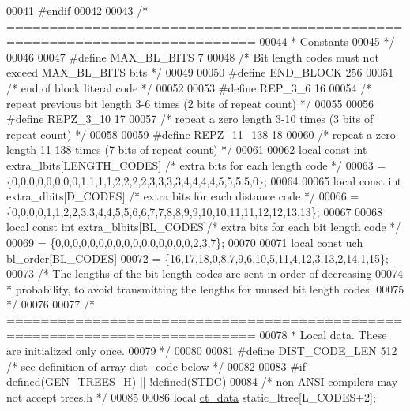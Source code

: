 \begin{DoxyCode}
00041 \textcolor{preprocessor}{#endif}
00042 
00043 \textcolor{comment}{/* ===========================================================================}
00044 \textcolor{comment}{ * Constants}
00045 \textcolor{comment}{ */}
00046 
00047 \textcolor{preprocessor}{#define MAX\_BL\_BITS 7}
00048 \textcolor{comment}{/* Bit length codes must not exceed MAX\_BL\_BITS bits */}
00049 
00050 \textcolor{preprocessor}{#define END\_BLOCK 256}
00051 \textcolor{comment}{/* end of block literal code */}
00052 
00053 \textcolor{preprocessor}{#define REP\_3\_6      16}
00054 \textcolor{comment}{/* repeat previous bit length 3-6 times (2 bits of repeat count) */}
00055 
00056 \textcolor{preprocessor}{#define REPZ\_3\_10    17}
00057 \textcolor{comment}{/* repeat a zero length 3-10 times  (3 bits of repeat count) */}
00058 
00059 \textcolor{preprocessor}{#define REPZ\_11\_138  18}
00060 \textcolor{comment}{/* repeat a zero length 11-138 times  (7 bits of repeat count) */}
00061 
00062 local \textcolor{keyword}{const} \textcolor{keywordtype}{int} extra\_lbits[LENGTH\_CODES] \textcolor{comment}{/* extra bits for each length code */}
00063    = \{0,0,0,0,0,0,0,0,1,1,1,1,2,2,2,2,3,3,3,3,4,4,4,4,5,5,5,5,0\};
00064 
00065 local \textcolor{keyword}{const} \textcolor{keywordtype}{int} extra\_dbits[D\_CODES] \textcolor{comment}{/* extra bits for each distance code */}
00066    = \{0,0,0,0,1,1,2,2,3,3,4,4,5,5,6,6,7,7,8,8,9,9,10,10,11,11,12,12,13,13\};
00067 
00068 local \textcolor{keyword}{const} \textcolor{keywordtype}{int} extra\_blbits[BL\_CODES]\textcolor{comment}{/* extra bits for each bit length code */}
00069    = \{0,0,0,0,0,0,0,0,0,0,0,0,0,0,0,0,2,3,7\};
00070 
00071 local \textcolor{keyword}{const} uch bl\_order[BL\_CODES]
00072    = \{16,17,18,0,8,7,9,6,10,5,11,4,12,3,13,2,14,1,15\};
00073 \textcolor{comment}{/* The lengths of the bit length codes are sent in order of decreasing}
00074 \textcolor{comment}{ * probability, to avoid transmitting the lengths for unused bit length codes.}
00075 \textcolor{comment}{ */}
00076 
00077 \textcolor{comment}{/* ===========================================================================}
00078 \textcolor{comment}{ * Local data. These are initialized only once.}
00079 \textcolor{comment}{ */}
00080 
00081 \textcolor{preprocessor}{#define DIST\_CODE\_LEN  512 }\textcolor{comment}{/* see definition of array dist\_code below */}\textcolor{preprocessor}{}
00082 
00083 \textcolor{preprocessor}{#if defined(GEN\_TREES\_H) || !defined(STDC)}
00084 \textcolor{comment}{/* non ANSI compilers may not accept trees.h */}
00085 
00086 local \hyperlink{structct__data__s}{ct\_data} static\_ltree[L\_CODES+2];

\end{DoxyCode}
